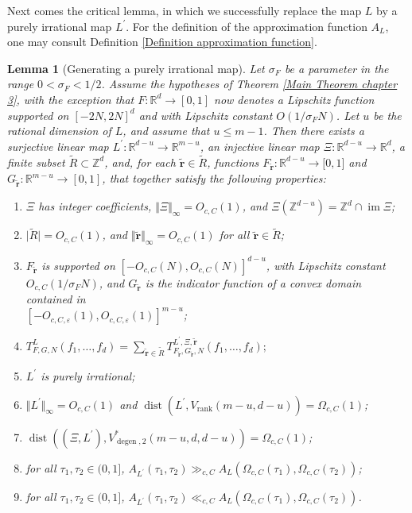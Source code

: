 \documentclass[12pt,a4paper,twoside,reqno]{amsart}
\newtheorem{Lemma}[Theorem]{Lemma}
\newcommand{\degen}{\operatorname{degen}}
\newcommand{\rank}{\operatorname{rank}}
\newcommand{\dist}{\operatorname{dist}}
\newcommand{\im}{\operatorname{im}}
\numberwithin{equation}{section}
\begin{document}
Next comes the critical lemma, in which we successfully replace the map $L$ by a purely irrational map $L^\prime$. For the definition of the approximation function $A_L$, one may consult Definition \ref{Definition approximation function}.
\begin{Lemma}[Generating a purely irrational map]
\label{Lemma generating a purely irrational map}
Let $\sigma_F$ be a parameter in the range $0<\sigma_F < 1/2$. Assume the hypotheses of Theorem \ref{Main Theorem chapter 3}, with the exception that $F:\mathbb{R}^d \longrightarrow [0,1]$ now denotes a Lipschitz function supported on $[-2N,2N]^d$ and with Lipschitz constant $O(1/\sigma_FN)$. Let $u$ be the rational dimension of $L$, and assume that $u\leqslant m-1$. Then there exists a surjective linear map $L^\prime:\mathbb{R}^{d-u} \longrightarrow \mathbb{R}^{m-u}$, an injective linear map $\Xi:\mathbb{R}^{d-u} \longrightarrow \mathbb{R}^d$, a finite subset $\widetilde{R}\subset \mathbb{Z}^d$, and, for each $\widetilde{\mathbf{r}} \in \widetilde{R}$, functions $F_{\widetilde{\mathbf{r}}}:\mathbb{R}^{d-u} \longrightarrow \mathbb [0,1]$ and $G_{\widetilde{\mathbf{r}}}:\mathbb{R}^{m-u} \longrightarrow [0,1]$, that together satisfy the following properties:
\begin{enumerate}[(1)]
\item $\Xi$ has integer coefficients, $\Vert \Xi \Vert_\infty  = O_{c,C}(1)$, and $\Xi(\mathbb{Z}^{d-u}) = \mathbb{Z}^d \cap \im \Xi$;
\item $\vert \widetilde{R}\vert = O_{c,C}(1)$, and $\Vert \widetilde{\mathbf{r}}\Vert_\infty = O_{c,C}(1)$ for all $\widetilde{\mathbf{r}} \in \widetilde{R}$;
\item $F_{\widetilde{\mathbf{r}}}$ is supported on $[-O_{c,C}(N),O_{c,C}(N)]^{d-u}$, with Lipschitz constant $O_{c,C}(1/\sigma_FN)$, and $G_{\widetilde{\mathbf{r}}}$ is the indicator function of a convex domain contained in \\$[-O_{c,C,\varepsilon}(1),O_{c,C,\varepsilon}(1)]^{m-u}$;
\item $T_{F,G,N}^L(f_1,\dots,f_d) = \sum\limits_{\widetilde{\mathbf{r}} \in \widetilde{R}}T_{F_{\widetilde{\mathbf{r}}},G_{\widetilde{\mathbf{r}}},N}^{L^\prime,\Xi,\widetilde{\mathbf{r}}}(f_1,\dots,f_d);$
\item $L^\prime$ is purely irrational;
\item $\Vert L^\prime\Vert_\infty = O_{c,C}(1)$ and $\dist(L^\prime, V_{\rank}(m-u,d-u)) = \Omega_{c,C}(1)$;
\item $\dist((\Xi,L^\prime),V_{\degen,2}^*(m-u,d,d-u)) = \Omega_{c,C}(1)$;
\item for all $\tau_1,\tau_2 \in (0,1]$, $A_{L^\prime}(\tau_1,\tau_2) \gg_{c,C} A_L(\Omega_{c,C}(\tau_1),\Omega_{c,C}(\tau_2))$;
\item for all $\tau_1,\tau_2 \in (0,1]$, $A_{L^\prime}(\tau_1,\tau_2) \ll_{c,C} A_L(\Omega_{c,C}(\tau_1),\Omega_{c,C}(\tau_2))$.
\end{enumerate}
\end{Lemma}
\end{document}

